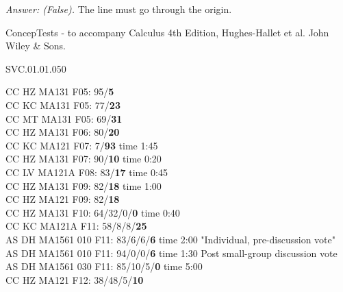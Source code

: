 {\it Answer: (False).} The line must go through the origin.

\medskip

ConcepTests - to accompany Calculus 4th Edition, Hughes-Hallet et al. John Wiley \& Sons.

SVC.01.01.050

CC HZ MA131 F05: 95/{\bf 5} \\
CC KC MA131 F05: 77/{\bf 23} \\
CC MT MA131 F05: 69/{\bf 31} \\
CC HZ MA131 F06: 80/{\bf 20} \\
CC KC MA121 F07: 7/{\bf 93} time 1:45 \\
CC HZ MA131 F07: 90/{\bf 10} time 0:20 \\ 
CC LV MA121A F08: 83/{\bf 17} time 0:45 \\
CC HZ MA131 F09: 82/{\bf18} time 1:00  \\
CC HZ MA121 F09: 82/{\bf18}  \\
CC HZ MA131 F10: 64/32/0/{\bf0} time 0:40  \\
CC KC MA121A F11: 58/8/8/{\bf25}  \\
AS DH MA1561 010 F11: 83/6/6/{\bf6} time 2:00 "Individual, pre-discussion vote" \\
AS DH MA1561 010 F11: 94/0/0/{\bf6} time 1:30 Post small-group discussion vote \\
AS DH MA1561 030 F11: 85/10/5/{\bf0} time 5:00  \\
CC HZ MA121 F12: 38/48/5/{\bf10}  \\
